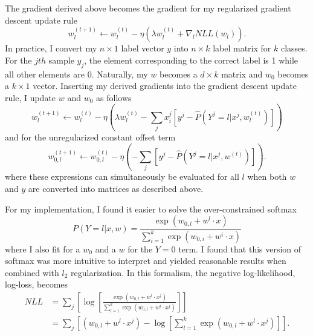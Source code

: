 \documentclass[12pt]{amsart}
\begin{document}
The gradient derived above becomes the gradient for my regularized gradient descent update rule
\begin{equation}
 w_l^{(t+1)} \leftarrow w_l^{(t)} - \eta (\lambda w_l^{(t)} + \nabla_l NLL(w_l)).
 \end{equation}
 In practice, I convert my $n \times 1$ label vector $y$ into $n \times k$ label matrix for $k$ classes.  For the $jth$ sample $y_j$, the element corresponding to the correct label is 1 while all other elements are 0.  Naturally, my $w$ becomes a $d \times k$ matrix and $w_0$ becomes a $k \times 1$ vector.  Inserting my derived gradients into the gradient descent update rule, I update $w$ and $w_0$ as follows
 \begin{equation}
w^{(t+1)}_l \leftarrow w^{(t)}_l - \eta (\lambda w^{(t)}_l - \sum_j x^j_i[y^j - \hat{P}(Y^j = l | x^j, w_l^{(t)})])
\end{equation}
and for the unregularized constant offset term
\begin{equation}
w^{(t+1)}_{0,l} \leftarrow w^{(t)}_{0,l} - \eta (- \sum_j[y^j - \hat{P}(Y^j = l | x^j, w^{(t)})]).
\end{equation}
where these expressions can simultaneously be evaluated for all $l$ when both $w$ and $y$ are converted into matrices as described above.

For my implementation, I found it easier to solve the over-constrained softmax
\begin{equation}
P(Y = l | x, w) = \frac{\exp{(w_{0,l} + w^l \cdot x)}}{\sum_{i = 1}^{k}\exp{(w_{0,i} + w^i \cdot x)}}
\end{equation}
where I also fit for a $w_0$ and a $w$ for the $Y = 0$ term.  I found that this version of softmax was more intuitive to interpret and yielded reasonable results when combined with $l_2$ regularization.  In this formalism, the negative log-likelihood, log-loss, becomes
\begin{equation} \label{eqn:softmax_logloss_exp_actual}
\begin{split}
NLL & = \sum_j \left[ \log \left[  \frac{\exp{(w_{0,l} + w^l \cdot x^j)}}{\sum_{l = 1}^{k}\exp{(w_{0,l} + w^i \cdot x^j)}} \right]\right] \\
& = \sum_j \left[(w_{0,l} + w^l \cdot x^j) - \log[\sum_{l = 1}^{k}\exp{(w_{0,l} + w^l \cdot x^j)}] \right].
\end{split}
\end{equation}
\end{document}
